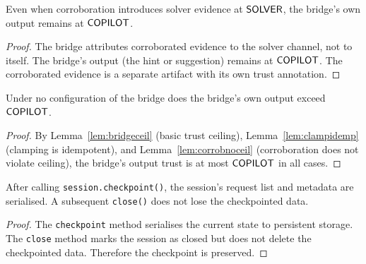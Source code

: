 \documentclass[11pt]{article}
\begin{document}
\begin{lemma}%
\label{lem:corrobnoceil}
Even when corroboration introduces solver evidence at
$\mathsf{SOLVER}$, the bridge's own output remains at $\mathsf{COPILOT}$.
\end{lemma}
\begin{proof}
The bridge attributes corroborated evidence to the solver
channel, not to itself.  The bridge's output (the hint or
suggestion) remains at $\mathsf{COPILOT}$.  The corroborated
evidence is a separate artifact with its own trust
annotation.
\end{proof}

\begin{corollary}%
\label{cor:bridgeinviolable}
Under no configuration of the bridge does the bridge's
own output exceed $\mathsf{COPILOT}$.
\end{corollary}
\begin{proof}
By Lemma~\ref{lem:bridgeceil} (basic trust ceiling),
Lemma~\ref{lem:clampidemp} (clamping is idempotent),
and Lemma~\ref{lem:corrobnoceil} (corroboration does
not violate ceiling), the bridge's output trust is at most
$\mathsf{COPILOT}$ in all cases.
\end{proof}

\begin{lemma}%
\label{lem:sesschkpt}
After calling \texttt{session.checkpoint()}, the session's
request list and metadata are serialised.  A subsequent
\texttt{close()} does not lose the checkpointed data.
\end{lemma}
\begin{proof}
The \texttt{checkpoint} method serialises the current state
to persistent storage.  The \texttt{close} method marks
the session as closed but does not delete the checkpointed
data.  Therefore the checkpoint is preserved.
\end{proof}
\end{document}
